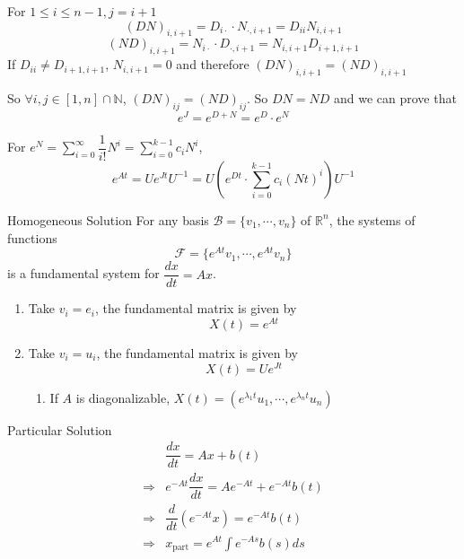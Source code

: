\documentclass{beamer}
\begin{document}
\begin{frame}
\begin{block}{}
For $1\leqslant i\leqslant n-1,j=i+1$
$$(DN)_{i,i+1}=D_{i\cdot}\cdot N_{\cdot,i+1}=D_{ii}N_{i,i+1}$$
$$(ND)_{i,i+1}=N_{i\cdot}\cdot D_{\cdot,i+1}=N_{i,i+1}D_{i+1,i+1}$$
If $D_{ii}\neq D_{i+1,i+1}$, $N_{i,i+1}=0$ and therefore $(DN)_{i,i+1}=(ND)_{i,i+1}$
\end{block}
\begin{block}{}
So $\forall i,j\in [1,n]\cap\mathbb{N}$, $(DN)_{ij}=(ND)_{ij}$. So $DN=ND$ and we can prove that 
$$e^{J}=e^{D+N}=e^D\cdot e^N$$
\end{block}
\begin{block}{}
For $e^N=\sum\limits_{i=0}^{\infty}\dfrac{1}{i!}N^i=\sum\limits_{i=0}^{k-1}c_iN^i$,
$$e^{At}=Ue^{Jt}U^{-1}=U(e^{Dt}\cdot \sum\limits_{i=0}^{k-1}c_i(Nt)^i )U^{-1}$$
\end{block}
\end{frame}

\begin{frame}
\begin{block}{Homogeneous Solution}
For any basis $\mathcal{B}=\lbrace v_1,\cdots,v_n\rbrace$ of $\mathbb{R}^n$, the systems of functions
$$\mathcal{F}=\lbrace e^{At}v_1,\cdots,e^{At}v_n\rbrace$$
is a fundamental system for $\dfrac{dx}{dt}=Ax$.
\begin{enumerate}
\item Take $v_i=e_i$, the fundamental matrix is given by
$$X(t)=e^{At}$$
\item Take $v_i=u_i$, the fundamental matrix is given by
$$X(t)=Ue^{Jt}$$
\begin{enumerate}
\item If $A$ is diagonalizable, $X(t)=(e^{\lambda_1t}u_1,\cdots,e^{\lambda_nt}u_n)$
\end{enumerate}
\end{enumerate}
\end{block}
\end{frame}

\begin{frame}
\begin{block}{Particular Solution}
\begin{align*}
&\dfrac{dx}{dt}=Ax+b(t)\\
\Rightarrow & e^{-At}\dfrac{dx}{dt}=Ae^{-At}+e^{-At}b(t)\\
\Rightarrow & \dfrac{d}{dt}(e^{-At}x)=e^{-At}b(t)\\
\Rightarrow & x_{\text{part}}=e^{At}\int e^{-As}b(s)ds
\end{align*}

\end{block}
\end{frame}
\end{document}
